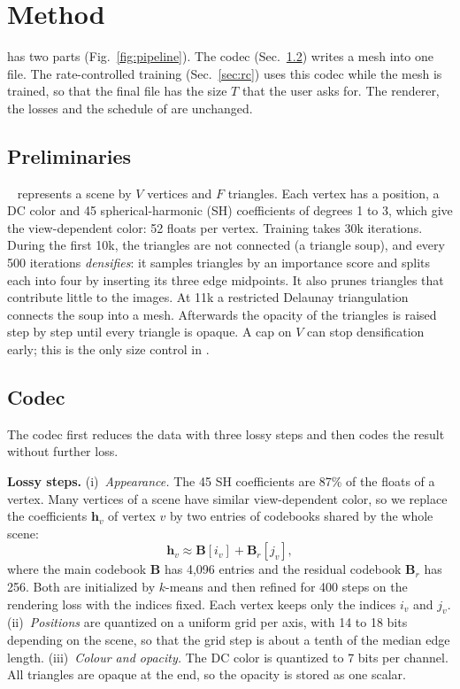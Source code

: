 \section{Method}
\label{sec:method}

\BM has two parts (Fig.~\ref{fig:pipeline}). The codec (Sec.~\ref{sec:codecm}) writes a mesh into one file. The rate-controlled training (Sec.~\ref{sec:rc}) uses this codec while the mesh is trained, so that the final file has the size $T$ that the user asks for. The renderer, the losses and the schedule of \MS are unchanged.

\subsection{Preliminaries}
\label{sec:prelim}
\MS~\cite{meshsplatting2025} represents a scene by $V$ vertices and $F$ triangles. Each vertex has a position, a DC color and 45 spherical-harmonic (SH) coefficients of degrees 1 to 3, which give the view-dependent color: 52 floats per vertex. Training takes 30k iterations. During the first 10k, the triangles are not connected (a triangle soup), and every 500 iterations \MS \emph{densifies}: it samples triangles by an importance score and splits each into four by inserting its three edge midpoints. It also prunes triangles that contribute little to the images. At 11k a restricted Delaunay triangulation connects the soup into a mesh. Afterwards the opacity of the triangles is raised step by step until every triangle is opaque. A cap on $V$ can stop densification early; this is the only size control in \MS.

\subsection{Codec}
\label{sec:codecm}
The codec first reduces the data with three lossy steps and then codes the result without further loss.

\noindent\textbf{Lossy steps.} (i)~\emph{Appearance.} The 45 SH coefficients are 87\% of the floats of a vertex. Many vertices of a scene have similar view-dependent color, so we replace the coefficients $\mathbf{h}_v$ of vertex $v$ by two entries of codebooks shared by the whole scene:
\begin{equation}
\mathbf{h}_v \approx \mathbf{B}[i_v] + \mathbf{B}_r[j_v],
\label{eq:cb}
\end{equation}
where the main codebook $\mathbf{B}$ has 4{,}096 entries and the residual codebook $\mathbf{B}_r$ has 256. Both are initialized by $k$-means and then refined for 400 steps on the rendering loss with the indices fixed. Each vertex keeps only the indices $i_v$ and $j_v$. (ii)~\emph{Positions} are quantized on a uniform grid per axis, with 14 to 18 bits depending on the scene, so that the grid step is about a tenth of the median edge length. (iii)~\emph{Colour and opacity.} The DC color is quantized to 7 bits per channel. All triangles are opaque at the end, so the opacity is stored as one scalar.

